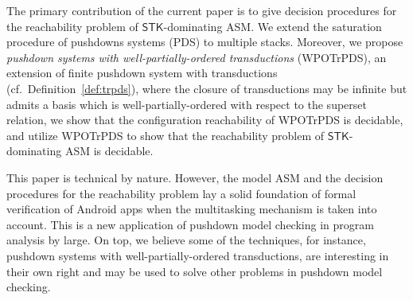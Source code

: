 \documentclass[preprint,12pt]{elsarticle}
\newcommand\singletask{{\sf STK}}
\newcommand\singleinstance{{\sf SIT}}
\newcommand{\AMASS}{\textsf{ASM}}
\newcommand{\STK}{\mathsf{STK}}
\newcommand{\PDS}{\textsf{PDS}}
\newcommand{\WOTrPDS}{\textsf{WPOTrPDS}}
\newcommand{\zhilin}[1]{\color{blue} {ZL: #1 :LZ} \color{black}}
\newcommand{\tl}[1]{\color{magenta} {TL: #1 :LT} \color{black}}
\newcommand{\zhilin}[1]{}
\newcommand{\tl}[1]{}
\begin{document}
The primary contribution of the current paper is to give decision procedures for the reachability problem of $\STK$-dominating {\AMASS}. We extend the saturation procedure of pushdowns systems (\PDS) to multiple stacks.  Moreover, we propose \emph{pushdown systems with well-partially-ordered transductions} (\WOTrPDS), an extension of finite pushdown system with transductions (cf.\ Definition~\ref{def:trpds}), where the closure of transductions may be infinite but admits a basis which is well-partially-ordered with respect to the superset relation, we show that the configuration reachability of {\WOTrPDS} is decidable, and utilize {\WOTrPDS} to show that the reachability problem of $\STK$-dominating {\AMASS} is decidable.

This paper is technical by nature. However, the model {\AMASS} and the decision procedures for the reachability problem lay a solid foundation of formal verification of Android apps when the multitasking mechanism is taken into account. This is a new application of pushdown model checking in program analysis by large. On top, we believe some of the techniques, for instance, pushdown systems with well-partially-ordered transductions, are interesting in their own right and may be used to solve other  problems in pushdown model checking.     
\end{document}
